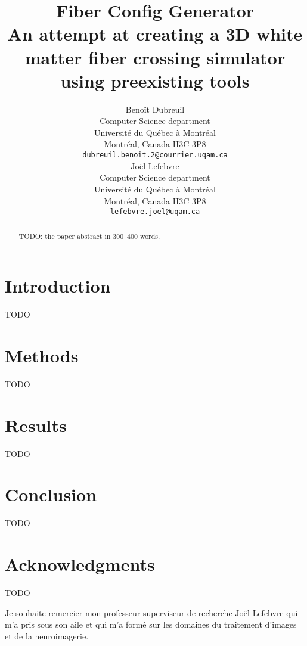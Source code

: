 \documentclass{article}
\title{
  Fiber Config Generator \\
  An attempt at creating a 3D white matter fiber crossing simulator using preexisting tools}
\author{
  Benoît Dubreuil \\
  Computer Science department \\
  Université du Québec à Montréal \\
  Montréal, Canada H3C 3P8 \\
  \texttt{dubreuil.benoit.2@courrier.uqam.ca} \\
  \And
  Joël Lefebvre \\
  Computer Science department\\
  Université du Québec à Montréal \\
  Montréal, Canada H3C 3P8\\
  \texttt{lefebvre.joel@uqam.ca} \\
}
\begin{document}
  \maketitle

  \begin{abstract}
    TODO: the paper abstract in 300--400 words.
  \end{abstract}


  \section{Introduction}
  \label{sec:introduction}

  TODO


  \section{Methods}
  \label{sec:methodology}

  TODO


  \section{Results}
  \label{sec:results}

  TODO


  \section{Conclusion}
  \label{sec:conclusion}

  TODO


  \section*{Acknowledgments}
  \label{sec:thanks}

  TODO

  Je souhaite remercier mon professeur-superviseur de recherche Joël Lefebvre qui m'a pris sous son aile et qui m'a formé sur les domaines du traitement d'images et
  de la neuroimagerie.


  
  
\end{document}
